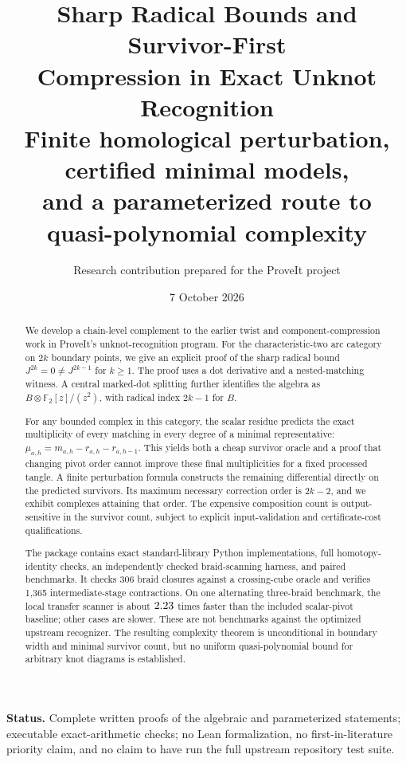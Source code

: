 \documentclass[11pt,letterpaper]{article}
\title{\textbf{Sharp Radical Bounds and Survivor-First\\Compression in Exact Unknot Recognition}\\[0.6em]
\large Finite homological perturbation, certified minimal models,\\
and a parameterized route to quasi-polynomial complexity}
\author{Research contribution prepared for the ProveIt project}
\date{7 October 2026}
\theoremstyle{definition}
\theoremstyle{remark}
\newcommand{\F}{\mathbb F_2}
\begin{document}
\maketitle
\begin{abstract}
We develop a chain-level complement to the earlier twist and component-compression
work in ProveIt's unknot-recognition program. For the characteristic-two arc
category on $2k$ boundary points, we give an explicit proof of the sharp radical
bound $J^{2k}=0\ne J^{2k-1}$ for $k\geq1$. The proof uses a dot derivative and a
nested-matching witness. A central marked-dot splitting further identifies the
algebra as $B\otimes\F[z]/(z^2)$, with radical index $2k-1$ for $B$.

For any bounded complex in this category, the scalar residue predicts the exact
multiplicity of every matching in every degree of a minimal representative:
$\mu_{a,h}=m_{a,h}-r_{a,h}-r_{a,h-1}$. This yields both a cheap survivor oracle and
a proof that changing pivot order cannot improve these final multiplicities for
a fixed processed tangle. A finite perturbation formula constructs the remaining
differential directly on the predicted survivors. Its maximum necessary
correction order is $2k-2$, and we exhibit complexes attaining that order.
The expensive composition count is output-sensitive in the survivor count,
subject to explicit input-validation and certificate-cost qualifications.

The package contains exact standard-library Python implementations, full
homotopy-identity checks, an independently checked braid-scanning harness, and
paired benchmarks. It checks 306 braid closures against a crossing-cube oracle
and verifies 1,365 intermediate-stage contractions. On one alternating
three-braid benchmark, the local transfer scanner is about $2.23$ times faster
than the included scalar-pivot baseline; other cases are slower. These are not
benchmarks against the optimized upstream recognizer. The resulting complexity
theorem is unconditional in boundary width and minimal survivor count, but no
uniform quasi-polynomial bound for arbitrary knot diagrams is established.
\end{abstract}
\noindent\textbf{Status.} Complete written proofs of the algebraic and parameterized
statements; executable exact-arithmetic checks; no Lean formalization, no
first-in-literature priority claim, and no claim to have run the full upstream
repository test suite.
\newpage
\begingroup\small\setlength{\parskip}{0pt}\tableofcontents\endgroup
\newpage
\end{document}
